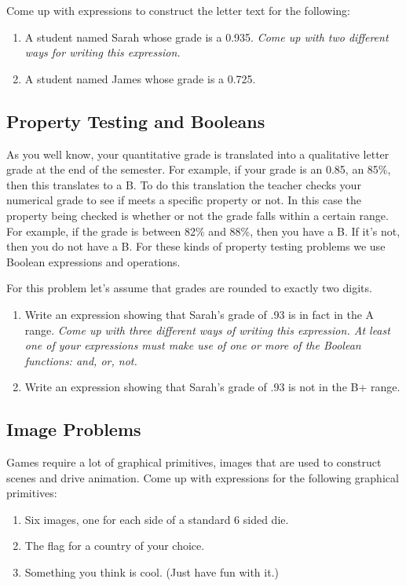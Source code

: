 \documentclass[nobib]{tufte-handout}
\begin{document}
Come up with expressions to construct the letter text for the following:
\begin{enumerate}
  \item A student named Sarah whose grade is a 0.935.  \textit{Come up with two different ways for writing this expression.}
  \item A student named James whose grade is a 0.725.
\end{enumerate}

\subsection{Property Testing and Booleans}

As you well know, your quantitative grade is translated into a qualitative letter grade at the end of the semester. For example, if your grade is an 0.85, an 85\%, then this translates to a B. To do this translation the teacher checks your numerical grade to see if meets a specific property or not. In this case the property being checked is whether or not the grade falls within a certain range. For example, if the grade is between 82\% and 88\%, then you have a B.  If it's not, then you do not have a B. For these kinds of property testing problems we use Boolean expressions and operations.

For this problem let's assume that grades are rounded to exactly two digits.
\begin{enumerate}
  \item Write an expression showing that Sarah's grade of .93 is in fact in the A range. \textit{Come up with three different ways of writing this expression. At least one of your expressions must make use of one or more of the Boolean functions: and, or, not. }
  \item Write an expression showing that Sarah's grade of .93 is not in the B+ range.
\end{enumerate}

\subsection{Image Problems}

Games require a lot of graphical primitives, images that are used to construct scenes and drive animation. Come up with expressions for the following graphical primitives:
\begin{enumerate}
  \item Six images, one for each side of a standard 6 sided die.
  \item The flag for a country of your choice.
  \item Something you think is cool. (Just have fun with it.)
\end{enumerate}
\end{document}
